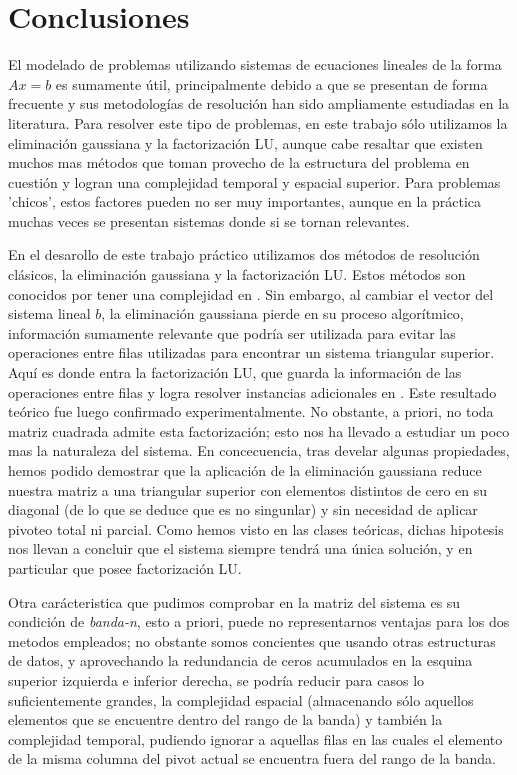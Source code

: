 \section{Conclusiones}

El modelado de problemas utilizando sistemas de ecuaciones lineales de la forma $Ax = b$ es sumamente útil, principalmente debido a que se presentan de forma frecuente y sus metodologías de resolución han sido ampliamente estudiadas en la literatura. Para resolver este tipo de problemas, en este trabajo sólo utilizamos la eliminación gaussiana y la factorización LU, aunque cabe resaltar que existen muchos mas métodos que toman provecho de la estructura del problema en cuestión y logran una complejidad temporal y espacial superior. Para problemas 'chicos', estos factores pueden no ser muy importantes, aunque en la práctica muchas veces se presentan sistemas donde si se tornan relevantes.

En el desarollo de este trabajo práctico utilizamos dos métodos de resolución clásicos, la eliminación gaussiana y la factorización LU. Estos métodos son conocidos por tener una complejidad en . Sin embargo, al cambiar el vector del sistema lineal $b$, la eliminación gaussiana pierde en su proceso algorítmico, información sumamente relevante que podría ser utilizada para evitar las operaciones entre filas utilizadas para encontrar un sistema triangular superior. Aquí es donde entra la factorización LU, que guarda la información de las operaciones entre filas y logra resolver instancias adicionales en . Este resultado teórico fue luego confirmado experimentalmente. No obstante, a priori, no toda matriz cuadrada admite esta factorización; esto nos ha llevado a estudiar un poco mas la naturaleza del sistema. En concecuencia, tras develar algunas propiedades, hemos podido demostrar que la aplicación de la eliminación gaussiana reduce nuestra matriz a una triangular superior con elementos distintos de cero en su diagonal (de lo que se deduce que es no singunlar) y sin necesidad de aplicar pivoteo total ni parcial. Como hemos visto en las clases teóricas, dichas hipotesis nos llevan a concluir que el sistema siempre tendrá una única solución, y en particular que posee factorización LU.

Otra carácteristica que pudimos comprobar en la matriz del sistema es su condición de \textit{banda-n}, esto a priori, puede no representarnos ventajas para los dos metodos empleados; no obstante somos concientes que usando otras estructuras de datos, y aprovechando la redundancia de ceros acumulados en la esquina superior izquierda e inferior derecha, se podría reducir para casos lo suficientemente grandes, la complejidad espacial (almacenando sólo aquellos elementos que se encuentre dentro del rango de la banda) y también la complejidad temporal, pudiendo ignorar a aquellas filas en las cuales el elemento de la misma columna del pivot actual se encuentra fuera del rango de la banda. 

